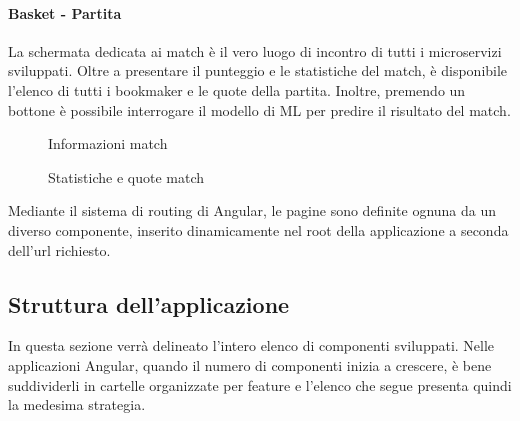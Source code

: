     \paragraph{Basket - Partita} La schermata dedicata ai match è il vero luogo di incontro di tutti i microservizi sviluppati. Oltre a presentare il punteggio e le statistiche del match, è disponibile l'elenco di tutti i bookmaker e le quote della partita. Inoltre, premendo un bottone è possibile interrogare il modello di ML per predire il risultato del match.
    \begin{figure}[H]
        \centering
        \caption{Informazioni match}
        \label{fig:enter-label}
    \end{figure}
    \begin{figure}[H]
        \centering
        \caption{Statistiche e quote match}
        \label{fig:enter-label}
    \end{figure}

Mediante il sistema di routing di Angular, le pagine sono definite ognuna da un diverso componente, inserito dinamicamente nel root della applicazione a seconda dell'url richiesto. 

\subsection{Struttura dell'applicazione}
In questa sezione verrà delineato l'intero elenco di componenti sviluppati. Nelle applicazioni Angular, quando il numero di componenti inizia a crescere, è bene suddividerli in cartelle organizzate per feature e l'elenco che segue presenta quindi la medesima strategia.

